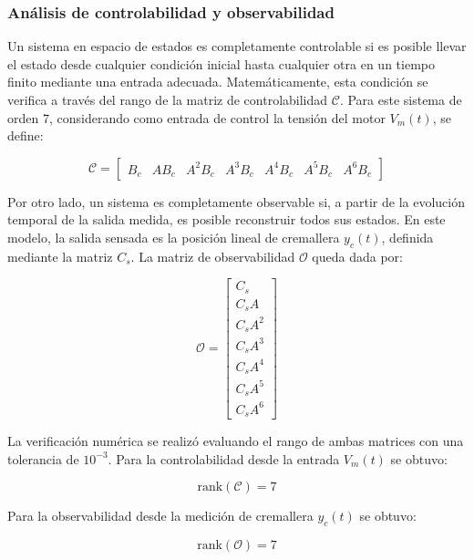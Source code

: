 \documentclass{article}
\begin{document}
\subsubsection{Análisis de controlabilidad y observabilidad}

Un sistema en espacio de estados es completamente controlable si es posible llevar el estado desde cualquier condición inicial hasta cualquier otra en un tiempo finito mediante una entrada adecuada. Matemáticamente, esta condición se verifica a través del rango de la matriz de controlabilidad $\mathcal{C}$. Para este sistema de orden 7, considerando como entrada de control la tensión del motor $V_m(t)$, se define:

\begin{equation}
\mathcal{C} = \begin{bmatrix}
B_c & AB_c & A^2B_c & A^3B_c & A^4B_c & A^5B_c & A^6B_c
\end{bmatrix}
\end{equation}

Por otro lado, un sistema es completamente observable si, a partir de la evolución temporal de la salida medida, es posible reconstruir todos sus estados. En este modelo, la salida sensada es la posición lineal de cremallera $y_c(t)$, definida mediante la matriz $C_s$. La matriz de observabilidad $\mathcal{O}$ queda dada por:

\begin{equation}
\mathcal{O} = \begin{bmatrix}
C_s \\
C_sA \\
C_sA^2 \\
C_sA^3 \\
C_sA^4 \\
C_sA^5 \\
C_sA^6
\end{bmatrix}
\end{equation}

La verificación numérica se realizó evaluando el rango de ambas matrices con una tolerancia de $10^{-3}$. Para la controlabilidad desde la entrada $V_m(t)$ se obtuvo:

\begin{equation}
\mathrm{rank}\left(\mathcal{C}\right)=7
\end{equation}

Para la observabilidad desde la medición de cremallera $y_c(t)$ se obtuvo:

\begin{equation}
\mathrm{rank}\left(\mathcal{O}\right)=7
\end{equation}
\end{document}
